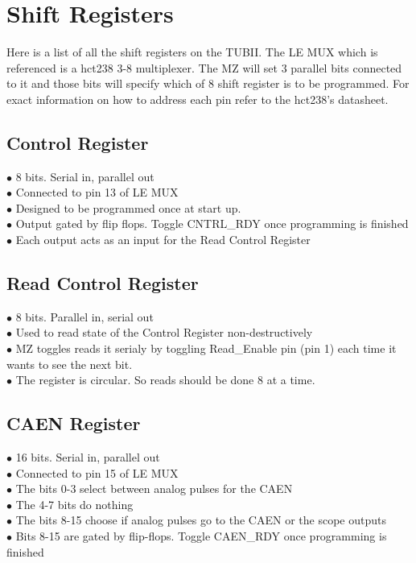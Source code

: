 \documentclass[11pt,a4paper]{article}
\begin{document}
\section{Shift Registers}
Here is a list of all the shift registers on the TUBII. The LE MUX which is referenced is a hct238 3-8 multiplexer. The MZ will set 3 parallel bits connected to
it and those bits will specify which of 8 shift register is to be programmed. For exact information on how to address each pin refer to the hct238's datasheet.
\subsection{Control Register}
$\bullet$ 8 bits. Serial in, parallel out\\
$\bullet$ Connected to pin 13 of LE MUX\\
$\bullet$ Designed to be programmed once at start up.\\
$\bullet$ Output gated by flip flops. Toggle CNTRL\_RDY once programming is finished\\
$\bullet$ Each output acts as an input for the Read Control Register\\
\subsection{Read Control Register}
$\bullet$ 8 bits. Parallel in, serial out \\
$\bullet$ Used to read state of the Control Register non-destructively \\
$\bullet$ MZ toggles reads it serialy by toggling Read\_Enable pin (pin 1) each time it wants to see the next bit.\\
$\bullet$ The register is circular. So reads should be done 8 at a time.\\
\subsection{CAEN Register}
$\bullet$ 16 bits. Serial in, parallel out\\
$\bullet$ Connected to pin 15 of LE MUX \\
$\bullet$ The bits 0-3 select between analog pulses for the CAEN\\
$\bullet$ The 4-7 bits do nothing\\
$\bullet$ The bits 8-15 choose if analog pulses go to the CAEN or the scope outputs\\
$\bullet$ Bits 8-15 are gated by flip-flops. Toggle CAEN\_RDY once programming is finished\\
\end{document}
